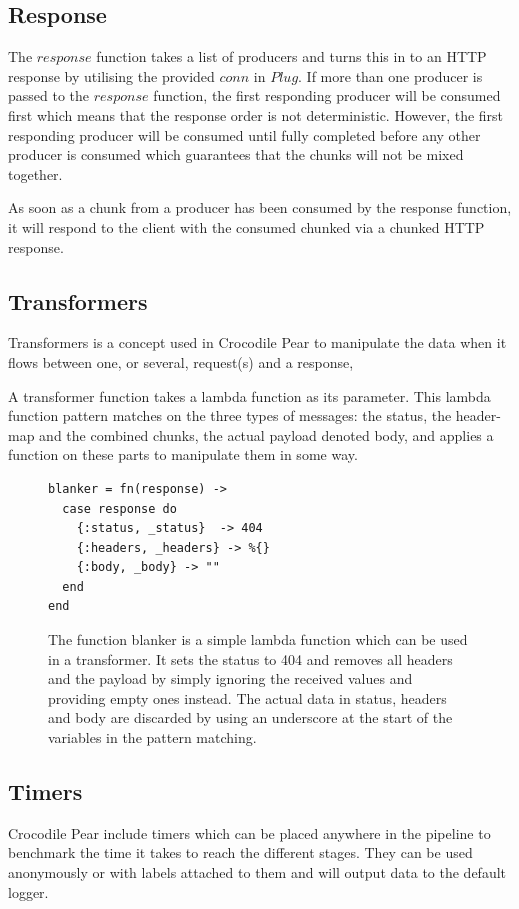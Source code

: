 \documentclass{cslthse-msc}
\begin{document}
\subsection{Response}
The $response$ function takes a list of producers and turns this in to an HTTP response by utilising the provided $conn$ in $Plug$. If more than one producer is passed to the $response$ function, the first responding producer will be consumed first which means that the response order is not deterministic. However, the first responding producer will be consumed until fully completed before any other producer is consumed which guarantees that the chunks will not be mixed together.

As soon as a chunk from a producer has been consumed by the response function, it will respond to the client with the consumed chunked via a chunked HTTP response.

\subsection{Transformers}
Transformers is a concept used in Crocodile Pear to manipulate the data when it flows between one, or several, request(s) and a response,

A transformer function takes a lambda function as its parameter. This lambda function pattern matches on the three types of messages: the status, the header-map and the combined chunks, the actual payload denoted body, and applies a function on these parts to manipulate them in some way.

\begin{figure}[H]
  \centering
\begin{lstlisting}[breaklines=true,frame=single]
blanker = fn(response) ->
  case response do
    {:status, _status}  -> 404
    {:headers, _headers} -> %{}
    {:body, _body} -> ""
  end
end
\end{lstlisting}
  \caption{The function blanker is a simple lambda function which can be used in a transformer. It sets the status to 404 and removes all headers and the payload by simply ignoring the received values and providing empty ones instead. The actual data in status, headers and body are discarded by using an underscore at the start of the variables in the pattern matching.}
\end{figure}

\subsection{Timers}
Crocodile Pear include timers which can be placed anywhere in the pipeline to benchmark the time it takes to reach the different stages. They can be used anonymously or with labels attached to them and will output data to the default logger.
\end{document}
